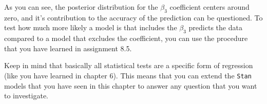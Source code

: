
\clearpage %


\rcodeanswertiny


As you can see, the posterior distribution for the $\beta_3$ coefficient centers around zero, and it's contribution to the accuracy of the prediction can be questioned. To test how much more likely a model is that includes the $\beta_3$ predicts the data compared to a model that excludes the coefficient, you can use the procedure that you have learned in assignment 8.5. \\


\rcodeanswerlarge


\rcodeanswermedium

\clearpage %


\fourlineanswerbox

Keep in mind that basically all statistical tests are a specific form of regression (like you have learned in chapter 6). This means that you can extend the \texttt{Stan} models that you have seen in this chapter to answer any question that you want to investigate.

\clearpage %